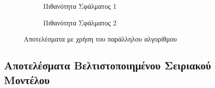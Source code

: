 \begin{figure}[!t]
    \centering
    \begin{subfigure}[t]{\textwidth}
        \centering
        \caption{Πιθανότητα Σφάλματος 1}
        \label{fig:chap6_parallel_4way_pail1_ipc}
    \end{subfigure}
    
    \begin{subfigure}[t]{\textwidth}
        \centering
        \caption{Πιθανότητα Σφάλματος 2}
        \label{fig:chap6_parallel_4way_pail2_ipc}
    \end{subfigure}
    \caption{Αποτελέσματα με χρήση του παράλληλου αλγορίθμου}
    \label{fig:chap6_parallel_4way_ipc}
\end{figure}


\subsection{Αποτελέσματα Βελτιστοποιημένου Σειριακού Μοντέλου}
\label{chap6_gem5OptimizedSerialAlgResults}

